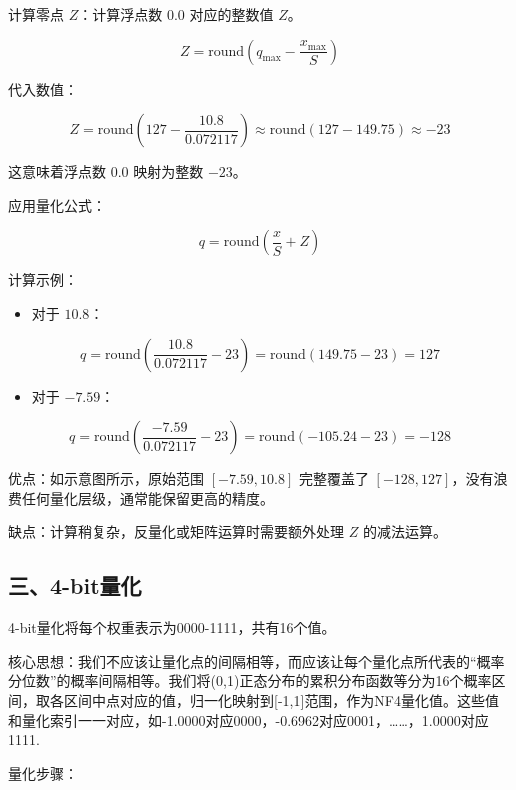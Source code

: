 计算零点 \(Z\)：计算浮点数 \(0.0\) 对应的整数值 \(Z\)。

\[
Z = \mathrm{round}\left(q_{\max} - \frac{x_{\max}}{S}\right)
\]

代入数值：

\[
Z = \mathrm{round}\left(127 - \frac{10.8}{0.072117}\right)
  \approx \mathrm{round}(127 - 149.75)
  \approx -23
\]

这意味着浮点数 \(0.0\) 映射为整数 \(-23\)。

应用量化公式：

\[
q = \mathrm{round}\left(\frac{x}{S} + Z\right)
\]

计算示例：

\begin{itemize}
\tightlist
\item
  对于 \(10.8\)：
\end{itemize}

\[
q = \mathrm{round}\left(\frac{10.8}{0.072117} - 23\right)
  = \mathrm{round}(149.75 - 23)
  = 127
\]

\begin{itemize}
\tightlist
\item
  对于 \(-7.59\)：
\end{itemize}

\[
q = \mathrm{round}\left(\frac{-7.59}{0.072117} - 23\right)
  = \mathrm{round}(-105.24 - 23)
  = -128
\]

优点：如示意图所示，原始范围 \([-7.59, 10.8]\) 完整覆盖了 \([-128, 127]\)，没有浪费任何量化层级，通常能保留更高的精度。

缺点：计算稍复杂，反量化或矩阵运算时需要额外处理 \(Z\) 的减法运算。

\hypertarget{ux4e094-bitux91cfux5316}{%
\subsection{三、4-bit量化}\label{ux4e094-bitux91cfux5316}}

4-bit量化将每个权重表示为0000-1111，共有16个值。

核心思想：我们不应该让量化点的间隔相等，而应该让每个量化点所代表的``概率分位数''的概率间隔相等。我们将(0,1)正态分布的累积分布函数等分为16个概率区间，取各区间中点对应的值，归一化映射到{[}-1,1{]}范围，作为NF4量化值。这些值和量化索引一一对应，如-1.0000对应0000，-0.6962对应0001，\ldots\ldots，1.0000对应1111.

量化步骤：

